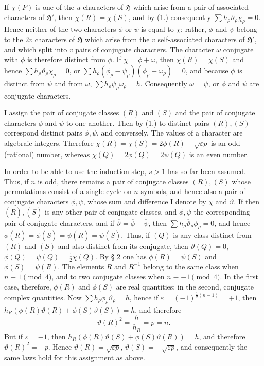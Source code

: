 \documentclass[11pt]{article}
\newcommand{\Hgr}{\mathfrak{H}}
\newcommand{\eps}{\varepsilon}
\begin{document}
If $\chi(P)$ is one of the $u$ characters of $\Hgr$ which arise from a pair of associated characters of $\Hgr'$, then $\chi(R)=\chi(S)$, and by (1.) consequently $\sum h_\rho\vartheta_\rho\chi_\rho=0$. Hence neither of the two characters $\phi$ or $\psi$ is equal to $\chi$; rather, $\phi$ and $\psi$ belong to the $2v$ characters of $\Hgr$ which arise from the $v$ self-associated characters of $\Hgr'$, and which split into $v$ pairs of conjugate characters. The character $\omega$ conjugate with $\phi$ is therefore distinct from $\phi$. If $\chi=\phi+\omega$, then $\chi(R)=\chi(S)$ and hence $\sum h_\rho\vartheta_\rho\chi_\rho=0$, or $\sum h_\rho(\phi_\rho-\psi_\rho)(\phi_\rho+\omega_\rho)=0$, and because $\phi$ is distinct from $\psi$ and from $\omega$, $\sum h_\rho\psi_\rho\omega_\rho=h$. Consequently $\omega=\psi$, or $\phi$ and $\psi$ are conjugate characters.

I assign the pair of conjugate classes $(R)$ and $(S)$ and the pair of conjugate characters $\phi$ and $\psi$ to one another. Then by (1.) to distinct pairs $(R),(S)$ correspond distinct pairs $\phi,\psi$, and conversely. The values of a character are algebraic integers. Therefore $\chi(R)=\chi(S)=2\phi(R)-\sqrt{\eps p}$ is an odd (rational) number, whereas $\chi(Q)=2\phi(Q)=2\psi(Q)$ is an even number.

In order to be able to use the induction step, $s>1$ has so far been assumed. Thus, if $n$ is odd, there remains a pair of conjugate classes $(R),(S)$ whose permutations consist of a single cycle on $n$ symbols, and hence also a pair of conjugate characters $\phi,\psi$, whose sum and difference I denote by $\chi$ and $\vartheta$. If then $(\overline{R}),(\overline{S})$ is any other pair of conjugate classes, and $\overline{\phi},\overline{\psi}$ the corresponding pair of conjugate characters, and if $\overline{\vartheta}=\overline{\phi}-\overline{\psi}$, then $\sum h_\rho\overline{\vartheta}_\rho\phi_\rho=0$, and hence $\phi(\overline{R})=\phi(\overline{S})=\psi(\overline{R})=\psi(\overline{S})$. Thus, if $(Q)$ is any class distinct from $(R)$ and $(S)$ and also distinct from its conjugate, then $\vartheta(Q)=0$, $\phi(Q)=\psi(Q)=\frac12\chi(Q)$. By § 2 one has $\phi(R)=\psi(S)$ and $\phi(S)=\psi(R)$. The elements $R$ and $R^{-1}$ belong to the same class when $n\equiv1\pmod 4$, and to two conjugate classes when $n\equiv -1\pmod 4$. In the first case, therefore, $\phi(R)$ and $\phi(S)$ are real quantities; in the second, conjugate complex quantities. Now $\sum h_\rho\phi_\rho\vartheta_\rho=h$, hence if $\eps=(-1)^{\frac12(n-1)}=+1$, then $h_R(\phi(R)\vartheta(R)+\phi(S)\vartheta(S))=h$, and therefore
\[
 \vartheta(R)^2=\frac{h}{h_R}=p=n.
\]
But if $\eps=-1$, then $h_R(\phi(R)\vartheta(S)+\phi(S)\vartheta(R))=h$, and therefore $\vartheta(R)^2=-p$. Hence $\vartheta(R)=\sqrt{\eps p}$, $\vartheta(S)=-\sqrt{\eps p}$, and consequently the same laws hold for this assignment as above.
\end{document}
